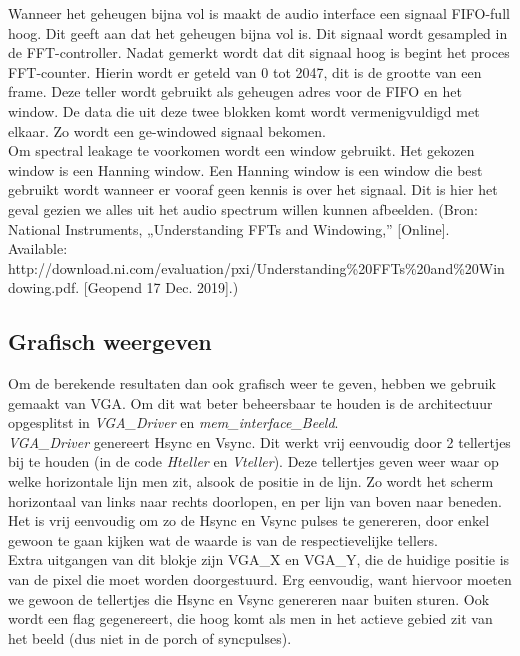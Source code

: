 \documentclass[a4paper,kul]{kulakarticle} %
\begin{document}
Wanneer het geheugen bijna vol is maakt de audio interface een signaal FIFO-full hoog. Dit geeft aan dat het geheugen bijna vol is. Dit signaal wordt gesampled in de FFT-controller. Nadat gemerkt wordt dat dit signaal hoog is begint het proces FFT-counter. Hierin wordt er geteld van 0 tot 2047, dit is de grootte van een frame. Deze teller wordt gebruikt als geheugen adres voor de FIFO en het window. De data die uit deze twee blokken komt wordt vermenigvuldigd met elkaar. Zo wordt een ge-windowed signaal bekomen.\\

Om spectral leakage te voorkomen wordt een window gebruikt. Het gekozen window is een Hanning window. Een Hanning window is een window die best gebruikt wordt wanneer er vooraf geen kennis is over het signaal. Dit is hier het geval gezien we alles uit het audio spectrum willen kunnen afbeelden.
(Bron: National Instruments, „Understanding FFTs and Windowing,” [Online]. Available: http://download.ni.com/evaluation/pxi/Understanding\%20FFTs\%20and\%20Windowing.pdf. [Geopend 17 Dec. 2019].)


\subsection{Grafisch weergeven}
Om de berekende resultaten dan ook grafisch weer te geven, hebben we gebruik gemaakt van VGA. Om dit wat beter beheersbaar te houden is de architectuur opgesplitst in \textit{VGA\_Driver} en \textit{mem\_interface\_Beeld}.\\

\textit{VGA\_Driver} genereert Hsync en Vsync. Dit werkt vrij eenvoudig door 2 tellertjes bij te houden (in de code \textit{Hteller} en \textit{Vteller}). Deze tellertjes geven weer waar op welke horizontale lijn men zit, alsook de positie in de lijn. Zo wordt het scherm horizontaal van links naar rechts doorlopen, en per lijn van boven naar beneden. Het is vrij eenvoudig om zo de Hsync en Vsync pulses te genereren, door enkel gewoon te gaan kijken wat de waarde is van de respectievelijke tellers.\\
Extra uitgangen van dit blokje zijn VGA\_X en VGA\_Y, die de huidige positie is van de pixel die moet worden doorgestuurd. Erg eenvoudig, want hiervoor moeten we gewoon de tellertjes die Hsync en Vsync genereren naar buiten sturen. Ook wordt een flag gegenereert, die hoog komt als men in het actieve gebied zit van het beeld (dus niet in de porch of syncpulses).\\
\end{document}
